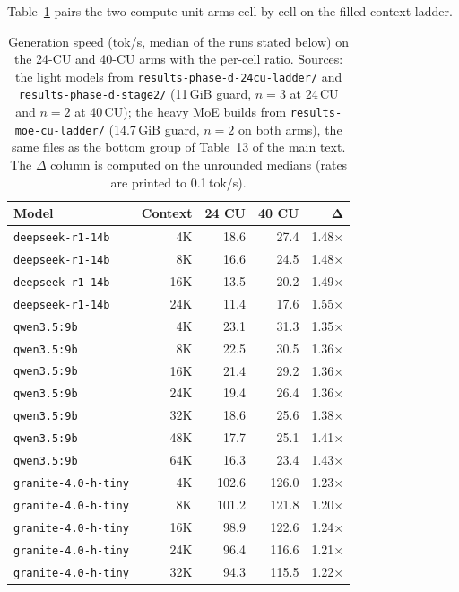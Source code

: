 \documentclass[11pt,a4paper]{article}
\begin{document}
Table~\ref{tab:s-cutier} pairs the two compute-unit arms cell by cell on
the filled-context ladder.

\begin{table}[h]
\centering\footnotesize
\caption{Generation speed (tok/s, median of the runs stated below) on the 24-CU and
40-CU arms with the per-cell ratio.  Sources: the light models from
\texttt{results-phase-d-24cu-ladder/} and \texttt{results-phase-d-stage2/}
(11\,GiB guard, $n{=}3$ at 24\,CU and $n{=}2$ at 40\,CU); the heavy MoE
builds from \texttt{results-moe-cu-ladder/} (14.7\,GiB guard, $n{=}2$ on
both arms), the same files as the bottom group of Table~13 of the main
text.  The $\Delta$ column is computed on the unrounded medians (rates
are printed to 0.1\,tok/s).}
\label{tab:s-cutier}
\begin{tabular}{@{}lrrrr@{}}
\toprule
\textbf{Model} & \textbf{Context} & \textbf{24 CU} & \textbf{40 CU} & $\boldsymbol{\Delta}$ \\
\midrule
\texttt{deepseek-r1-14b} & 4K & 18.6 & 27.4 & 1.48$\times$ \\
\texttt{deepseek-r1-14b} & 8K & 16.6 & 24.5 & 1.48$\times$ \\
\texttt{deepseek-r1-14b} & 16K & 13.5 & 20.2 & 1.49$\times$ \\
\texttt{deepseek-r1-14b} & 24K & 11.4 & 17.6 & 1.55$\times$ \\
\midrule
\texttt{qwen3.5:9b} & 4K & 23.1 & 31.3 & 1.35$\times$ \\
\texttt{qwen3.5:9b} & 8K & 22.5 & 30.5 & 1.36$\times$ \\
\texttt{qwen3.5:9b} & 16K & 21.4 & 29.2 & 1.36$\times$ \\
\texttt{qwen3.5:9b} & 24K & 19.4 & 26.4 & 1.36$\times$ \\
\texttt{qwen3.5:9b} & 32K & 18.6 & 25.6 & 1.38$\times$ \\
\texttt{qwen3.5:9b} & 48K & 17.7 & 25.1 & 1.41$\times$ \\
\texttt{qwen3.5:9b} & 64K & 16.3 & 23.4 & 1.43$\times$ \\
\midrule
\texttt{granite-4.0-h-tiny} & 4K & 102.6 & 126.0 & 1.23$\times$ \\
\texttt{granite-4.0-h-tiny} & 8K & 101.2 & 121.8 & 1.20$\times$ \\
\texttt{granite-4.0-h-tiny} & 16K & 98.9 & 122.6 & 1.24$\times$ \\
\texttt{granite-4.0-h-tiny} & 24K & 96.4 & 116.6 & 1.21$\times$ \\
\texttt{granite-4.0-h-tiny} & 32K & 94.3 & 115.5 & 1.22$\times$ \\

\end{tabular}
\end{table}
\end{document}
